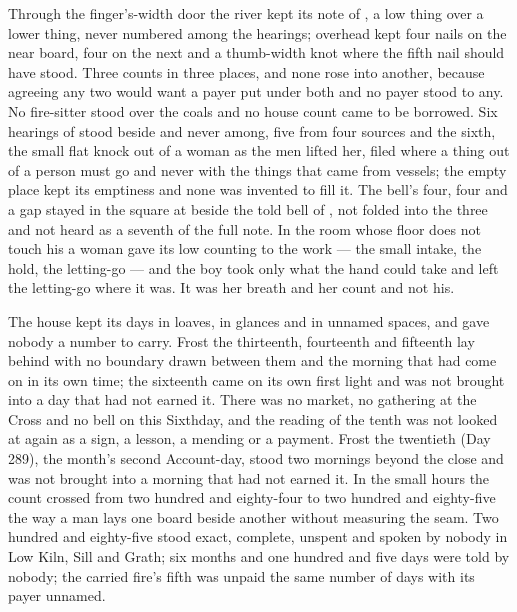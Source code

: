 Through the finger's-width door the river kept its note of , a low thing over a lower thing, never numbered among the hearings; overhead  kept four nails on the near board, four on the next and a thumb-width knot where the fifth nail should have stood. Three counts in three places, and none rose into another, because agreeing any two would want a payer put under both and no payer stood to any. No fire-sitter stood over the coals and no house count came to be borrowed. Six hearings of  stood beside and never among, five from four sources and the sixth, the small flat knock out of a woman as the men lifted her, filed where a thing out of a person must go and never with the things that came from vessels; the empty place kept its emptiness and none was invented to fill it. The bell's four, four and a gap stayed in the square at  beside the told bell of , not folded into the three and not heard as a seventh of the full note. In the room whose floor does not touch his a woman gave its low counting to the work --- the small intake, the hold, the letting-go --- and the boy took only what the hand could take and left the letting-go where it was. It was her breath and her count and not his.

The house kept its days in loaves, in glances and in unnamed spaces, and gave nobody a number to carry. Frost the thirteenth, fourteenth and fifteenth lay behind with no boundary drawn between them and the morning that had come on in its own time; the sixteenth came on its own first light and was not brought into a day that had not earned it. There was no market, no gathering at the Cross and no bell on this Sixthday, and the reading of the tenth was not looked at again as a sign, a lesson, a mending or a payment. Frost the twentieth (Day 289), the month's second Account-day, stood two mornings beyond the close and was not brought into a morning that had not earned it. In the small hours the count crossed from two hundred and eighty-four to two hundred and eighty-five the way a man lays one board beside another without measuring the seam. Two hundred and eighty-five stood exact, complete, unspent and spoken by nobody in Low Kiln, Sill and Grath; six months and one hundred and five days were told by nobody; the carried fire's fifth was unpaid the same number of days with its payer unnamed.

